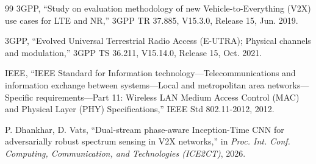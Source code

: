 \documentclass[review]{elsarticle}
\begin{document}
\begin{thebibliography}{99}
 3GPP, ``Study on evaluation methodology of new
Vehicle-to-Everything (V2X) use cases for LTE and NR,'' 3GPP TR 37.885,
V15.3.0, Release 15, Jun. 2019.

 3GPP, ``Evolved Universal Terrestrial Radio Access
(E-UTRA); Physical channels and modulation,'' 3GPP TS 36.211, V15.14.0,
Release 15, Oct. 2021.

 IEEE, ``IEEE Standard for Information
technology---Telecommunications and information exchange between
systems---Local and metropolitan area networks---Specific
requirements---Part 11: Wireless LAN Medium Access Control (MAC) and
Physical Layer (PHY) Specifications,'' IEEE Std 802.11-2012, 2012.

 P. Dhankhar, D. Vats, ``Dual-stream phase-aware
Inception-Time CNN for adversarially robust spectrum sensing in V2X
networks,'' in \emph{Proc. Int. Conf. Computing, Communication, and
Technologies (ICE2CT)}, 2026.

\end{thebibliography}
\end{document}

